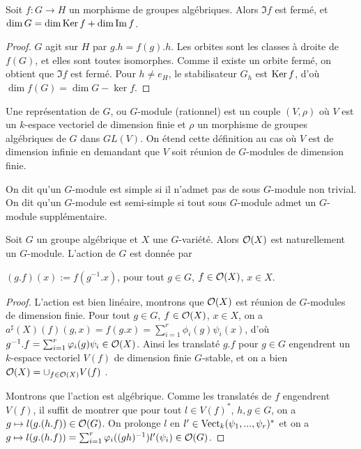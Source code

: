 \begin{prop}
Soit $f:G\rightarrow H$ un morphisme de groupes algébriques. Alors $\Im f$ est fermé, et $\dim G=\dim\operatorname{Ker} f+\dim\operatorname{Im} f$.
\end{prop}
\begin{proof}
$G$ agit sur $H$ par $g.h=f(g).h$. Les orbites sont les classes à droite de $f(G)$, et elles sont toutes isomorphes. Comme il existe un orbite fermé, on obtient que $\Im f$ est fermé. Pour $h\neq e_H$, le stabilisateur $G_h$ est $\operatorname{Ker} f$, d'où $\dim f(G)=\dim G-\ker f$.
\end{proof}


\begin{defn}
Une représentation de $G$, ou $G$-module (rationnel) est un couple $(V, \rho)$ où $V$ est un $k$-espace vectoriel de dimension finie et $\rho$ un morphisme de groupes algébriques de $G$ dans $GL(V)$. On étend cette définition au cas où $V$ est de dimension infinie en demandant que $V$ soit réunion de $G$-modules de dimension finie.

On dit qu'un $G$-module est simple si il n'admet pas de sous $G$-module non trivial. On dit qu'un $G$-module est semi-simple si tout sous $G$-module admet un $G$-module supplémentaire.
\end{defn}

\begin{prop}\label{GmoduleSectionsGlobales}
Soit $G$ un groupe algébrique et $X$ une $G$-variété. Alors $\mathcal{O}(X)$ est naturellement un $G$-module. L'action de $G$ est donnée par
\begin{center}
$(g.f)(x):=f(g^{-1}.x)$, pour tout $g\in G$, $f\in \mathcal{O}(X)$, $x\in X$. 
\end{center}
\end{prop}
\begin{proof}
L'action est bien linéaire, montrons que $\mathcal{O}(X)$ est réunion de $G$-modules de dimension finie. Pour tout $g\in G$, $f\in \mathcal{O}(X)$, $x\in X$, on a $a^\sharp(X)(f)(g,x)=f(g.x)=\sum_{i=1}^r\phi_i(g)\psi_i(x)$, d'où $g^{-1}.f=\sum_{i=1}^r\varphi_i(g)\psi_i\in \mathcal{O}(X)$. Ainsi les translaté $g.f$ pour $g\in G$ engendrent un $k$-espace vectoriel $V(f)$ de dimension finie $G$-stable, et on a bien $\mathcal{O}(X)=\cup_{f\in \mathcal{O}(X)}V(f)$ .

Montrons que l'action est algébrique. Comme les translatés de $f$ engendrent $V(f)$, il suffit de montrer que pour tout $l\in V(f)^*$, $h,g\in G$, on a $g\mapsto l(g.(h.f))\in \mathcal{O}(G)$. On prolonge $l$ en $l'\in \operatorname{Vect}_k(\psi_1,...,\psi_r)^*$ et on a $ g\mapsto l(g.(h.f))=\sum_{i=1}^r\varphi_i((gh)^{-1})l'(\psi_i)\in \mathcal{O}(G)$.
\end{proof}

